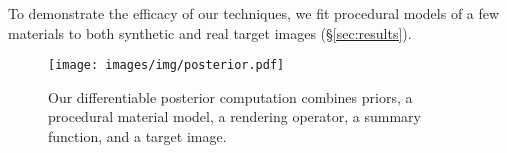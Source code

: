 To demonstrate the efficacy of our techniques, we fit procedural models of a few materials to both synthetic and real target images (\S\ref{sec:results}).

\begin{figure*}[t]
	\texttt{[image: images/img/posterior.pdf]}
	\caption{Our differentiable posterior computation combines priors, a procedural material model, a rendering operator, a summary function, and a target image.}
	\label{fig:posterior}
\end{figure*}
